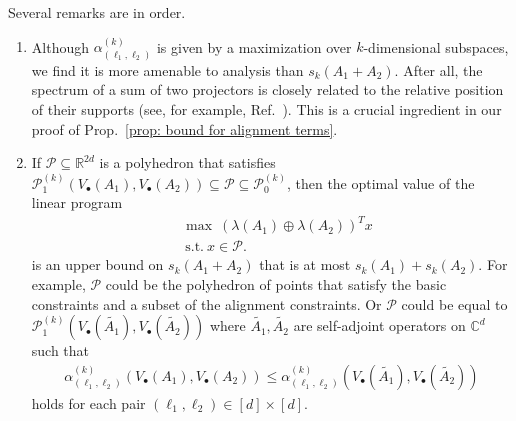 \documentclass[12pt]{article}
\theoremstyle{definition}
\numberwithin{equation}{section}
\numberwithin{equation}{section}
\newcommand{\al}{\alpha}
\newcommand{\la}{\lambda}
\newcommand{\cP}{\mathcal{P}}
\newcommand{\bC}{\mathbb{C}}
\newcommand{\bR}{\mathbb{R}}
\begin{document}
Several remarks are in order. 
\begin{enumerate}    
    \item Although \(\al_{(\ell_1, \ell_2)}^{(k)}\) is given by a maximization over \(k\)-dimensional subspaces, we find it is more amenable to analysis than \(s_k(A_1 + A_2)\). After all, the spectrum of a sum of two projectors is closely related to the relative position of their supports (see, for example, Ref.~\cite{Halmos1969}). This is a crucial ingredient in our proof of Prop.~\ref{prop: bound for alignment terms}. 
    
    \item If \(\cP \subseteq \bR^{2d}\) is a polyhedron that satisfies \(\cP_1^{(k)} (V_\bullet(A_1), V_\bullet(A_2)) \subseteq \cP \subseteq \cP_0^{(k)}\), then the optimal value of the linear program 
    \begin{equation}
    \label{def: lin program upper}
    \begin{aligned}
    &\max \: (\la (A_1) \oplus \la(A_2))^T x\\
    &\: \text{s.t.} \: x \in \cP.
    \end{aligned}
    \end{equation}
    is an upper bound on \(s_k (A_1 + A_2)\) that is at most \(s_k(A_1) + s_k(A_2)\). For example, \(\cP\) could be the polyhedron of points that satisfy the basic constraints and a subset of the alignment constraints. Or \(\cP\) could be equal to \(\cP_1^{(k)} (V_
    \bullet(\tilde{A_1}), V_\bullet (\tilde{A_2}))\) where \(\tilde{A_1}, \tilde{A_2}\) are self-adjoint operators on \(\bC^d\) such that 
    \begin{align}
    \label{eq: alignment comparison}
    \al_{(\ell_1, \ell_2)}^{(k)} (V_\bullet (A_1), V_\bullet(A_2)) \leq \al_{(\ell_1, \ell_2)}^{(k)} (V_\bullet (\tilde{A_1}), V_\bullet(\tilde{A_2}))
    \end{align}
    holds for each pair \((\ell_1, \ell_2) \in [d] \times [d]\). 
    

\end{enumerate}
\end{document}
